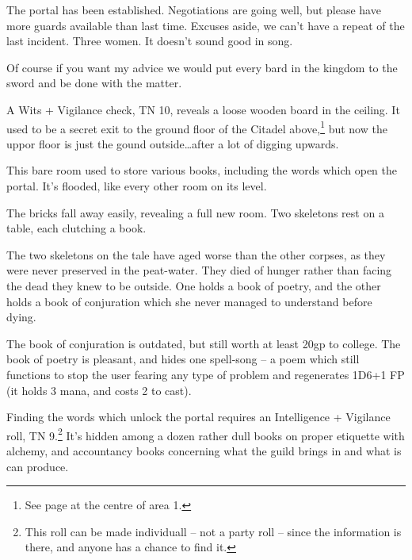 \begin{multicols}{2}
\begin{exampletext}

	The portal has been established.  Negotiations are going well, but please have more guards available than last time.  Excuses aside, we can't have a repeat of the last incident.  Three women.  It doesn't sound good in song.

	Of course if you want my advice we would put every bard in the kingdom to the sword and be done with the matter.

\end{exampletext}

A Wits + Vigilance check, TN 10, reveals a loose wooden board in the ceiling.  It used to be a secret exit to the ground floor of the Citadel above,\footnote{See page \pageref{lost_citadel} at the centre of area 1.} but now the uppor floor is just the gound outside\ldots after a lot of digging upwards.


This bare room used to store various books, including the words which open the portal.  It's flooded, like every other room on its level.

\begin{boxtext}

	The bricks fall away easily, revealing a full new room.  Two skeletons rest on a table, each clutching a book.

\end{boxtext}

The two skeletons on the tale have aged worse than the other corpses, as they were never preserved in the peat-water.  They died of hunger rather than facing the dead they knew to be outside.  One holds a book of poetry, and the other holds a book of conjuration which she never managed to understand before dying.

The book of conjuration is outdated, but still worth at least 20gp to \gls{college}.  The book of poetry is pleasant, and hides one spell-song -- a poem which still functions to stop the user fearing any type of problem and regenerates 1D6+1 FP (it holds 3 mana, and costs 2 to cast).

Finding the words which unlock the portal requires an Intelligence + Vigilance roll, TN 9.\footnote{This roll can be made individuall -- not a party roll -- since the information is there, and anyone has a chance to find it.}  It's hidden among a dozen rather dull books on proper etiquette with alchemy, and accountancy books concerning what the guild brings in and what is can produce.


\end{multicols}
